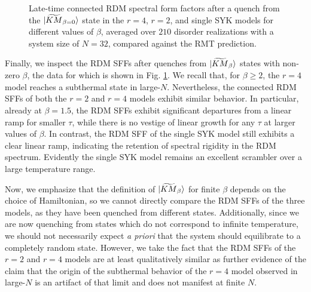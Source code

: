 \documentclass[reprint, floatfix,eqsecnum,superscriptaddress,preprint,nofootinbib,onecolumn,amsmath,amssymb,aps,prb]{revtex4-2}
\begin{document}
\begin{figure*}%
  \caption{Late-time connected RDM spectral form factors after a quench from the $\ket{\widetilde{KM}_{\beta = 0}}$ state in the $r=4$, $r=2$, and single SYK models for different values of $\beta$, averaged over $210$ disorder realizations with a system size of $N=32$, compared against the RMT prediction.}  
  \label{fig:rdm-sff-beta}
\end{figure*}

Finally, we inspect the RDM SFFs after quenches from $\ket{\widetilde{KM}_\beta}$ states with non-zero $\beta$, the data for which is shown in Fig. \ref{fig:rdm-sff-beta}. We recall that, for $\beta \geq 2$, the $r=4$ model reaches a subthermal state in large-$N$. %
Nevertheless, the connected RDM SFFs of both the $r=2$ and $r=4$ models exhibit similar behavior. %
In particular, already at $\beta = 1.5$, the RDM SFFs exhibit significant departures from a linear ramp for smaller $\tau$, while there is no vestige of linear growth for any $\tau$ at larger values of $\beta$.
In contrast, the RDM SFF of the single SYK model still exhibits a clear linear ramp, indicating the retention of spectral rigidity in the RDM spectrum. Evidently the single SYK model remains an excellent scrambler over a large temperature range.

Now, we emphasize that the definition of $\ket{\widetilde{KM}_\beta}$ for finite $\beta$ depends on the choice of Hamiltonian, so we cannot directly compare the RDM SFFs of the three models, as they have been quenched from different states. Additionally, since we are now quenching from states which do not correspond to infinite temperature, %
we should not necessarily expect \textit{a priori} that the system should equilibrate to a completely random state. However, we take the fact that the RDM SFFs of the $r=2$ and $r=4$ models are at least qualitatively similar as further evidence of the claim that the origin of the subthermal behavior of the $r=4$ model observed in large-$N$ is an artifact of that limit and does not manifest at finite $N$.
\end{document}
